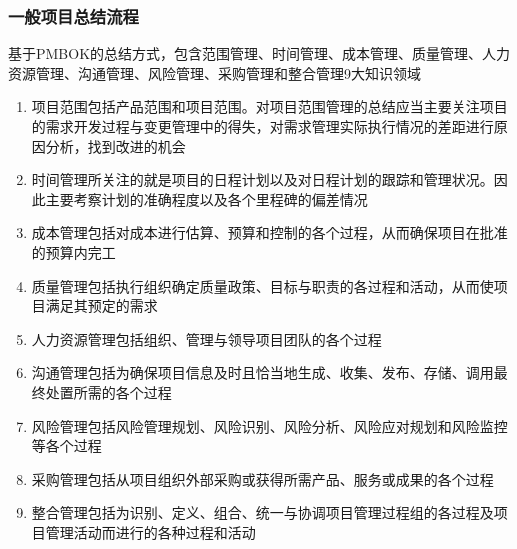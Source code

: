 \subsubsection{一般项目总结流程}
基于PMBOK的总结方式，包含范围管理、时间管理、成本管理、质量管理、人力资源管理、沟通管理、风险管理、采购管理和整合管理9大知识领域
\begin{enumerate}[label=\arabic*.]
    \item 项目范围包括产品范围和项目范围。对项目范围管理的总结应当主要关注项目的需求开发过程与变更管理中的得失，对需求管理实际执行情况的差距进行原因分析，找到改进的机会
    \item 时间管理所关注的就是项目的日程计划以及对日程计划的跟踪和管理状况。因此主要考察计划的准确程度以及各个里程碑的偏差情况
    \item 成本管理包括对成本进行估算、预算和控制的各个过程，从而确保项目在批准的预算内完工
    \item 质量管理包括执行组织确定质量政策、目标与职责的各过程和活动，从而使项目满足其预定的需求
    \item 人力资源管理包括组织、管理与领导项目团队的各个过程
    \item 沟通管理包括为确保项目信息及时且恰当地生成、收集、发布、存储、调用最终处置所需的各个过程
    \item 风险管理包括风险管理规划、风险识别、风险分析、风险应对规划和风险监控等各个过程
    \item 采购管理包括从项目组织外部采购或获得所需产品、服务或成果的各个过程
    \item 整合管理包括为识别、定义、组合、统一与协调项目管理过程组的各过程及项目管理活动而进行的各种过程和活动
\end{enumerate}

